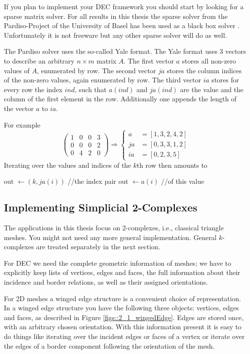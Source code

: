 If you plan to implement your DEC framework you should start by looking for a sparse matrix solver. For all results in this thesis the sparse solver from the Pardiso-Project of the University of Basel has been used as a black box solver \cite{pardiso1}. Unfortunately it is not freeware but any other sparse solver will do as well.

The Pardiso solver uses the so-called Yale format. The Yale format uses 3 vectors to describe an arbitrary $n\times m$ matrix $A$. The first vector $a$ stores all non-zero values of $A$, enumerated by row. The second vector $ja$ stores the column indices of the non-zero values, again enumerated by row. The third vector $ia$ stores for every row the index $ind$, such that $a(ind)$ and $ja(ind)$ are the value and the column of the first element in the row. Additionally one appends the length of the vector $a$ to $ia$.

For example 
\[\begin{pmatrix}
1 & 0 & 0 &3 \\
 0 & 0 & 0 &2 \\
 0 & 4&2&0
\end{pmatrix} \Rightarrow \begin{cases} a &= [1,3,2,4,2]\\ ja &= [0,3,3,1,2] \\ ia &= [0,2,3,5]  \end{cases}\]
Iterating over the values and indices of the $k$th row then amounts to
\begin{algorithmic}
	\STATE out $\gets (k,ja(i))$   //the index pair
	\STATE out $\gets a(i)$  //of this value
\ENDFOR
\end{algorithmic}

\subsection{Implementing Simplicial 2-Complexes}
\label{sec::2_handsOnSimplicialComplexes}
The applications in this thesis focus on 2-complexes, i.e., classical triangle meshes. You might not need any more general implementation. General $k$-complexes are treated separately in the next section. 

For DEC we need the complete geometric information of meshes; we have to explicitly keep lists of vertices, edges and faces, the full information about their incidence and border relations, as well as their assigned orientations. 

For 2D meshes a winged edge structure is a convenient choice of representation. In a winged edge structure you have the following three objects: vertices, edges and faces, as described in Figure \ref{figs::2_1_wingedEdge}. Edges are stored once, with an arbitrary chosen orientation. With this information present it is easy to do things like iterating over the incident edges or faces of a vertex or iterate over the edges of a border component following the orientation of the mesh.

